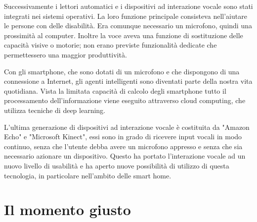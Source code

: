 \documentclass[twoside]{supsistudent}
\begin{document}
Successivamente i lettori automatici e i dispositivi ad interazione vocale sono stati integrati nei sistemi operativi. La loro funzione principale consisteva nell'aiutare le persone con delle disabilità. Era comunque necessario un microfono, quindi una prossimità al computer. Inoltre la voce aveva una funzione di sostituzione delle capacità visive o motorie; non erano previste funzionalità dedicate che permettessero una maggior produttività.

Con gli smartphone, che sono dotati di un microfono e che dispongono di una connessione a Internet, gli agenti intelligenti sono diventati parte della nostra vita quotidiana. Vista la limitata capacità di calcolo degli smartphone tutto il processamento dell'informazione viene eseguito attraverso cloud computing, che utilizza tecniche di deep learning. \cite{deeplearninggeneral}

L'ultima generazione di dispositivi ad interazione vocale è costituita da "Amazon Echo" e "Microsoft Kinect", essi sono in grado di ricevere input vocali in modo continuo, senza che l'utente debba avere un microfono appresso e senza che sia necessario azionare un dispositivo. Questo ha portato l'interazione vocale ad un nuovo livello di usabilità e ha aperto nuove possibilità di utilizzo di questa tecnologia, in particolare nell'ambito delle smart home.

\section{Il momento giusto}
\end{document}
